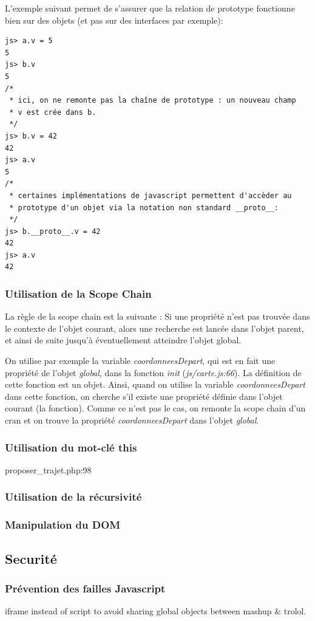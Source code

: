 \documentclass[a4paper]{article}
\begin{document}
L'exemple suivant permet de s'assurer que la relation de prototype fonctionne
bien sur des objets (et pas sur des interfaces par exemple):
\begin{verbatim}
js> a.v = 5
5
js> b.v
5
/*
 * ici, on ne remonte pas la chaîne de prototype : un nouveau champ
 * v est crée dans b.
 */
js> b.v = 42
42
js> a.v
5
/*
 * certaines implémentations de javascript permettent d'accèder au
 * prototype d'un objet via la notation non standard __proto__:
 */
js> b.__proto__.v = 42
42
js> a.v
42
\end{verbatim}

\subsubsection{Utilisation de la Scope Chain}

La règle de la scope chain est la suivante :
Si une propriété n'est pas trouvée dans le contexte de l'objet courant,
alors une recherche est lancée dans l'objet parent, et ainsi de suite
jusqu'à éventuellement atteindre l'objet global. 

On utilise par exemple la variable \textit{coordonneesDepart}, qui est en
 fait une propriété de l'objet \textit{global}, dans la fonction \textit{init} 
 (\textit{js/carte.js:66}). 
La définition de cette fonction est un objet. Ainsi, 
quand on utilise la variable \textit{coordonneesDepart} dans cette fonction,
on cherche s'il existe une propriété définie dans l'objet courant
(la fonction).
Comme ce n'est pas le cas, on remonte la scope chain d'un cran et on trouve
la propriété \textit{coordonneesDepart} dans l'objet \textit{global}.

\subsubsection{Utilisation du mot-clé this}
proposer\_trajet.php:98
\subsubsection{Utilisation de la récursivité}
\subsubsection{Manipulation du DOM}

\subsection{Securité} 
\subsubsection{Prévention des failles Javascript}
iframe instead of script to avoid sharing global objects
between mashup \& trolol.
\end{document}
